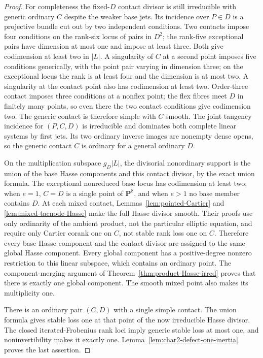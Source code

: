\begin{proof}
For completeness the fixed-$D$ contact divisor is still
irreducible with generic ordinary $C$ despite the weaker
base jets. Its incidence over $P\in D$ is a projective bundle
cut out by two independent conditions. Two contacts impose
four conditions on the rank-six locus of pairs in $D^2$;
the rank-five exceptional pairs have dimension at most one
and impose at least three. Both give codimension at least
two in $|L|$. A singularity of $C$ at a second point imposes
five conditions generically, with the point pair varying in
dimension three; on the exceptional locus the rank is at
least four and the dimension is at most two. A singularity
at the contact point also has codimension at least two.
Order-three contact imposes three conditions at a nonflex
point; the flex fibres meet $D$ in finitely many points, so
even there the two contact conditions give codimension two.
The generic contact is therefore simple with $C$ smooth.
The joint tangency incidence for $(P,C,D)$ is irreducible
and dominates both complete linear systems by first jets.
Its two ordinary inverse images are nonempty dense opens,
so the generic contact $C$ is ordinary for a general ordinary
$D$.

On the multiplication subspace $g_D|L|$, the divisorial
nonordinary support is the union of the base Hasse components
and this contact divisor, by the exact union formula.
The exceptional nonreduced base locus has codimension at least
two; when $e=1$, $C=D$ is a single point of $\mathbf P^8$,
and when $e>1$ no base member contains $D$.
At each mixed contact, Lemmas~\ref{lem:pointed-Cartier} and
\ref{lem:mixed-tacnode-Hasse} make the full Hasse divisor
smooth. Their proofs use only ordinarity of the ambient product,
not the particular elliptic equation, and require only Cartier
corank one on $C$, not stable rank loss one on $C$. Therefore every base
Hasse component and the contact divisor are assigned to the
same global Hasse component. Every global component has a
positive-degree nonzero restriction to this linear subspace,
which contains an ordinary point. The component-merging
argument of Theorem~\ref{thm:product-Hasse-irred} proves that
there is exactly one global component. The smooth mixed
point also makes its multiplicity one.

There is an ordinary pair $(C,D)$ with a single simple
contact. The union formula gives stable loss one at that
point of the now irreducible Hasse divisor. The closed
iterated-Frobenius rank loci imply generic stable loss at
most one, and noninvertibility makes it exactly one.
Lemma~\ref{lem:char2-defect-one-inertia} proves the last assertion.
\end{proof}

